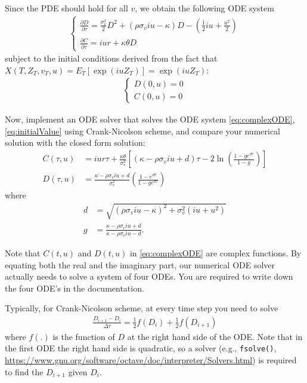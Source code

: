 \documentclass[10pt,a4paper,hidelinks,fleqn]{article}            %
\newcommand{\pder}[2]{\frac{\partial#1}{\partial#2}}
\begin{document}
Since the PDE should hold for all $v$, we obtain the following ODE system
\begin{align}
\begin{cases}
\pder{D}{\tau} = \frac{\sigma_v^2}{2} D^2 + (\rho\sigma_viu - \kappa)D - (\frac12 iu + \frac{u^2}{2}) \\
\pder{C}{\tau} = iur + \kappa \theta D
\end{cases}
\label{eq:complexODE}
\end{align}
subject to the initial conditions derived from the fact that $X(T, Z_T, v_T, u) = E_T[\exp(iuZ_T)] = \exp(iuZ_T)$:
\begin{align}
\begin{cases}
D(0, u) = 0 \\
C(0, u) = 0
\end{cases}
\label{eq:initialValue}
\end{align}

Now, implement an ODE solver that solves the ODE system \eqref{eq:complexODE}, \eqref{eq:initialValue} using Crank-Nicolson scheme,
and compare your numerical solution with the closed form solution:
\begin{align}
C(\tau, u) & = iur\tau + \frac{\kappa \theta}{\sigma_v^2} \left[ 
(\kappa - \rho \sigma_v iu + d)\tau - 2 \ln \left( \frac{1-ge^{d\tau}}{1-g}\right) 
\right] \label{eq:closedFormC} \\
D(\tau, u) & = \frac{\kappa - \rho \sigma_v iu + d}{\sigma_v^2} \left( \frac{1-e^{d\tau}}{1-ge^{d\tau}} \right)
\label{eq:closedFormD}
\end{align}
where
\begin{align}
d & = \sqrt{(\rho \sigma_v iu - \kappa)^2 + \sigma_v^2 (iu+u^2)} \\
g & = \frac{\kappa - \rho \sigma_v iu + d}{\kappa - \rho \sigma_v iu - d}.
\end{align}

Note that $C(t, u)$ and $D(t, u)$ in \eqref{eq:complexODE} are complex functions.
By equating both the real and the imaginary part, our numerical ODE solver actually needs to solve a system of four ODEs.
You are required to write down the four ODE's in the documentation. 

Typically, for Crank-Nicolson scheme, at every time step you need to solve 
\begin{align*}
\frac{D_{i+1} - D_i}{\Delta \tau} = \frac{1}{2}f(D_i) + \frac{1}{2}f(D_{i+1})
\end{align*}
where $f(.)$ is the function of $D$ at the right hand side of the ODE.
Note that in the first ODE the right hand side is quadratic, 
so a solver (e.g., \verb=fsolve()=, \url{https://www.gnu.org/software/octave/doc/interpreter/Solvers.html}) is required to find the $D_{i+1}$ given $D_i$.
\end{document}
